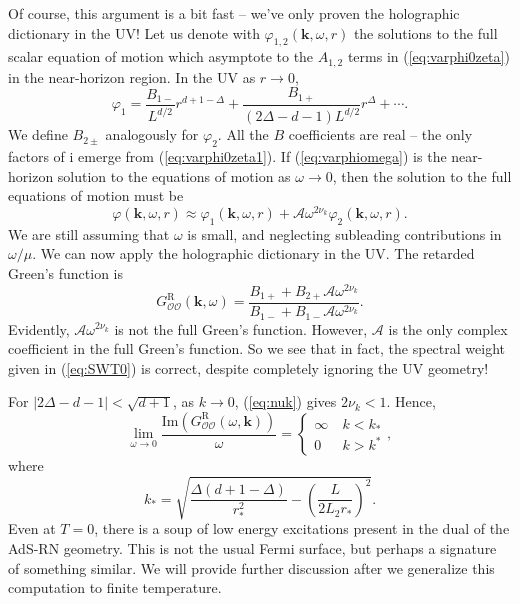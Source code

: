 \documentclass[10pt, oneside]{book}
\begin{document}
\begin{doublespace}
Of course, this argument is a bit fast -- we've only proven the holographic dictionary in the UV!   Let us denote with $\varphi_{1,2}(\mathbf{k},\omega, r)$ the solutions to the full scalar equation of motion which asymptote to the $A_{1,2}$ terms in (\ref{eq:varphi0zeta}) in the near-horizon region.  In the UV as $r\rightarrow 0$, \begin{equation}
\varphi_{1} = \frac{B_{1-}}{L^{d/2}} r^{d+1-\Delta} + \frac{B_{1+}}{(2\Delta-d-1)L^{d/2}} r^\Delta + \cdots.
\end{equation}
We define $B_{2\pm}$ analogously for $\varphi_2$.   All the $B$ coefficients are real -- the only factors of i emerge from (\ref{eq:varphi0zeta1}).   If (\ref{eq:varphiomega}) is the near-horizon solution to the equations of motion as $\omega \rightarrow 0$, then the solution to the full equations of motion must be \begin{equation}
\varphi(\mathbf{k},\omega,r) \approx \varphi_1(\mathbf{k},\omega,r) + \mathcal{A}\omega^{2\nu_k} \varphi_2(\mathbf{k},\omega,r).
\end{equation}
We are still assuming that $\omega$ is small, and neglecting subleading contributions in $\omega/\mu$.  We can now apply the holographic dictionary in the UV.  The retarded Green's function is \begin{equation}
G^{\mathrm{R}}_{\mathcal{OO}}(\mathbf{k},\omega) = \frac{B_{1+} + B_{2+}\mathcal{A}\omega^{2\nu_k}}{B_{1-} + B_{1-}\mathcal{A}\omega^{2\nu_k}}.
\end{equation}
Evidently, $\mathcal{A}\omega^{2\nu_k}$ is  not the full Green's function.   However, $\mathcal{A}$ is the only complex coefficient in the full Green's function.  So we see that in fact, the spectral weight given in (\ref{eq:SWT0}) is correct, despite completely ignoring the UV geometry!  

For $|2\Delta-d-1| < \sqrt{d+1}$, as $k \rightarrow 0$, (\ref{eq:nuk}) gives $2\nu_k <1$.  Hence, \begin{equation}
\lim_{\omega \rightarrow 0} \frac{\mathrm{Im}\left(G^{\mathrm{R}}_{\mathcal{OO}}(\omega,\mathbf{k})\right)}{\omega} = \left\lbrace\begin{array}{ll} \infty &\  k<k_* \\ 0 &\ k>k^* \end{array}\right.,
\end{equation}
where \begin{equation}
k_* = \sqrt{\frac{\Delta(d+1-\Delta)}{r_*^2} - \left(\frac{L}{2L_2 r_*}\right)^2}.
\end{equation}
Even at $T=0$, there is a soup of low energy excitations present in the dual of the AdS-RN geometry.  This is not the usual Fermi surface, but perhaps a signature of something similar.  We will provide further discussion after we generalize this computation to finite temperature.


\end{doublespace}
\end{document}
